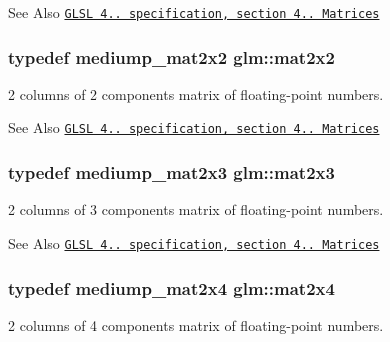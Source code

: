 \begin{DoxySeeAlso}{See Also}
\href{http://www.opengl.org/registry/doc/GLSLangSpec.4.20.8.pdf}{\tt G\-L\-S\-L 4.. specification, section 4.. Matrices} 
\end{DoxySeeAlso}
\hypertarget{group__core__types_gac35d9aae8d7beaceba6d18f6e26261a4}{
\subsubsection[{mat2x2}]{\setlength{\rightskip}{0pt plus 5cm}typedef mediump\-\_\-mat2x2 {\bf glm\-::mat2x2}}}\label{group__core__types_gac35d9aae8d7beaceba6d18f6e26261a4}


2 columns of 2 components matrix of floating-\/point numbers. 

\begin{DoxySeeAlso}{See Also}
\href{http://www.opengl.org/registry/doc/GLSLangSpec.4.20.8.pdf}{\tt G\-L\-S\-L 4.. specification, section 4.. Matrices} 
\end{DoxySeeAlso}
\hypertarget{group__core__types_gad23070b803932f5f3c9d9c2fd4d64895}{
\subsubsection[{mat2x3}]{\setlength{\rightskip}{0pt plus 5cm}typedef mediump\-\_\-mat2x3 {\bf glm\-::mat2x3}}}\label{group__core__types_gad23070b803932f5f3c9d9c2fd4d64895}


2 columns of 3 components matrix of floating-\/point numbers. 

\begin{DoxySeeAlso}{See Also}
\href{http://www.opengl.org/registry/doc/GLSLangSpec.4.20.8.pdf}{\tt G\-L\-S\-L 4.. specification, section 4.. Matrices} 
\end{DoxySeeAlso}
\hypertarget{group__core__types_gaa78542b8bfa06cd48c53dcd0d0a00707}{
\subsubsection[{mat2x4}]{\setlength{\rightskip}{0pt plus 5cm}typedef mediump\-\_\-mat2x4 {\bf glm\-::mat2x4}}}\label{group__core__types_gaa78542b8bfa06cd48c53dcd0d0a00707}


2 columns of 4 components matrix of floating-\/point numbers. 

